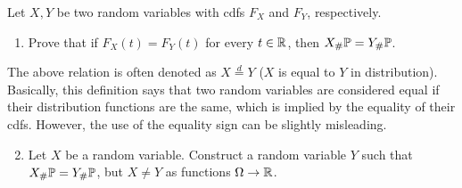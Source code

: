 \begin{problem}
Let $X,Y$ be two random variables with cdfs $F_X$ and $F_Y$, respectively. 
\begin{enumerate}[label=(\alph*)]
\item Prove that if $F_X(t) = F_Y(t)$ for every $t \in \mathbb R$, then $X_\# \mathbb P = Y_\# \mathbb P$. 
\end{enumerate}
The above relation is often denoted as $X \stackrel{d}{=} Y$ ($X$ is equal to $Y$ in distribution). Basically, this definition says that two random variables are considered equal if their distribution functions are the same, which is implied by the equality of their cdfs. However, the use of the equality sign can be slightly misleading.
\begin{enumerate}
\setcounter{enumi}{1}
\item Let $X$ be a random variable. Construct a random variable $Y$ such that $X_\# \mathbb P = Y_\# \mathbb P$, but $X \ne Y$ as functions $\Omega \to \mathbb R$.
\end{enumerate}
\end{problem}


